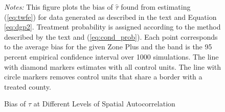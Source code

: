 \documentclass[11pt]{article}
\begin{document}
\begin{figure}[tbh!]
    \caption{Bias of $\hat{\tau}$ at Different Levels of Spatial Autocorrelation}
    \label{fig:bias_spatial_autocorr}
    {\centering
    }

    {\footnotesize
        \textit{Notes:} This figure plots the bias of $\hat{\tau}$ found from estimating (\ref{eq:twfe}) for data generated as described in the text and Equation \ref{eq:dgp2}. Treatment probability is assigned according to the method described by the text and (\ref{eq:cond_prob}). Each point corresponds to the average bias for the given Zone Plus and the band is the 95 percent empirical confidence interval over 1000 simulations. The line with diamond markers estimates with all control units. The line with circle markers removes control units that share a border with a treated county. 
    }
\end{figure}
\end{document}
